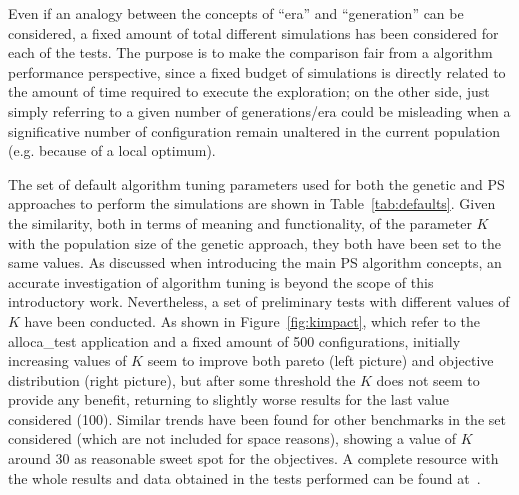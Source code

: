 Even if an analogy between the concepts of ``era'' and ``generation'' 
can be considered, a fixed amount of total different simulations has been
considered for each of the tests. The purpose is to make the
comparison fair from a algorithm performance perspective, since a
fixed budget of simulations is directly related to the amount of time
required to execute the exploration; on the other side, just simply
referring to a given number of generations/era could be misleading when a
significative number of configuration remain unaltered in the current
population (e.g. because of a local optimum).

The set of default algorithm tuning parameters used for both the
genetic and PS approaches to perform the simulations are shown in
Table~\ref{tab:defaults}. Given the similarity, both in terms of
meaning and functionality, of the parameter $K$ with the population size
of the genetic approach, they both have been set to the same values. As discussed
when introducing the main PS algorithm concepts, an accurate
investigation of algorithm tuning is beyond the scope of this
introductory work. Nevertheless, a set of preliminary tests with
different values of $K$ have been conducted. As shown in
Figure~\ref{fig:kimpact}, which refer to the alloca\_test application
and a fixed amount of 500 configurations, initially increasing values
of $K$ seem to improve both pareto (left picture) and objective
distribution (right picture), but after some threshold the $K$ does
not seem to provide any benefit, returning to slightly worse
results for the last value considered (100). Similar trends have been
found for other benchmarks in the set considered (which are
not included for space reasons), showing a value of $K$ around 30 as
reasonable sweet spot for the objectives. A complete resource with the whole 
results and data obtained in the tests performed can be found
at~\cite{ps_results}.

\begin{table}
\end{table}

